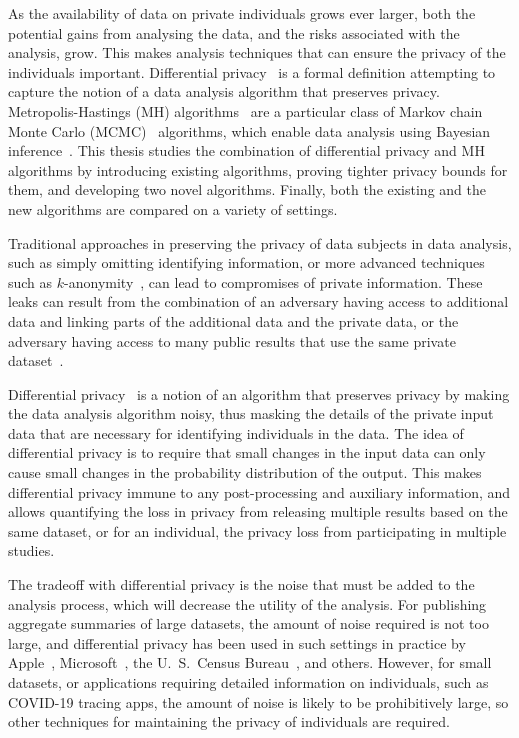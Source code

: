 \documentclass[english,twoside,openright]{HYgraduMLDS}
\begin{document}
As the availability of data on private individuals grows ever larger, both the
potential gains from analysing the data, and the risks associated with the
analysis, grow. This makes analysis techniques that can ensure the privacy
of the individuals important. Differential
privacy~\cite{DMN06} is a formal definition attempting to capture the notion
of a data analysis algorithm that preserves privacy.
Metropolis-Hastings (MH) algorithms~\cite{MRR53, Has70} are a particular class of
Markov chain Monte Carlo (MCMC)~\cite{Robert04} algorithms, which
enable data analysis using
Bayesian inference~\cite{BDA}. This thesis studies the combination of
differential privacy and MH algorithms by introducing existing algorithms, proving
tighter privacy bounds for them, and developing two novel algorithms.
Finally, both the existing and the new algorithms are compared on a variety of
settings.

Traditional approaches in preserving the privacy of data subjects in data
analysis, such as simply omitting identifying information, or
more advanced techniques such as \(k\)-anonymity~\cite{SaS98, Sam01},
can lead to compromises of private information. These leaks can result from
the combination of an
adversary having access to additional data and linking parts of the additional
data and the private data, or the adversary having access to many
public results that use the same private dataset~\cite{DiN03}.

Differential privacy~\cite{DMN06} is a notion of an algorithm that preserves
privacy by making the data analysis algorithm noisy, thus masking the details of
the private input data that are necessary for identifying individuals in the data.
The idea of differential privacy is to require that small changes in the input
data can only cause small changes in the probability distribution of the
output. This makes differential privacy immune to any post-processing and
auxiliary information, and allows quantifying the loss in privacy from releasing
multiple results based on the same dataset, or for an individual, the privacy
loss from participating in multiple studies.

The tradeoff with differential privacy is the noise that must be added to the
analysis process, which will decrease the utility of the analysis. For publishing
aggregate summaries of large datasets, the amount of noise required is not too
large, and differential privacy has been used in such settings in practice by
Apple~\cite{App17}, Microsoft~\cite{DKY17}, the U.\ S.\ Census Bureau~\cite{Abo18},
and others. However, for small datasets, or applications requiring detailed
information on individuals, such as COVID-19 tracing apps, the amount of
noise is likely to be prohibitively large, so other techniques for maintaining
the privacy of individuals are required.
\end{document}
